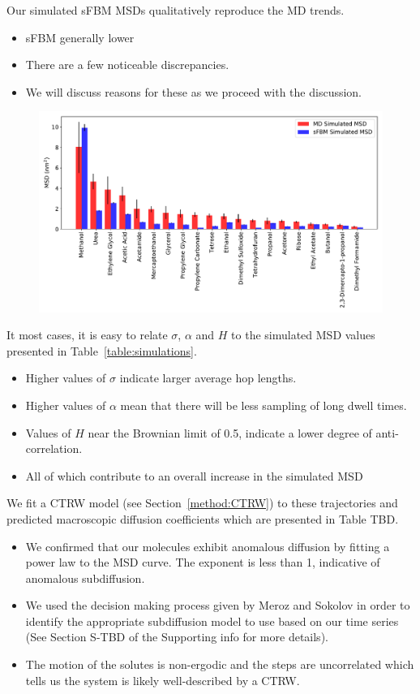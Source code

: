 \documentclass{article}
\begin{document}
  Our simulated sFBM MSDs qualitatively reproduce the MD trends.
  \begin{itemize}
    \item sFBM generally lower
    \item There are a few noticeable discrepancies.
    \item We will discuss reasons for these as we proceed with the discussion.
  \end{itemize}

  \begin{figure}
  \centering
  \includegraphics[width=\textwidth]{all_emsds.pdf}
  \caption{}\label{fig:all_msds}
  \end{figure}

  It most cases, it is easy to relate $\sigma$, $\alpha$ and $H$ to the
  simulated MSD values presented in Table~\ref{table:simulations}. 
  \begin{itemize}
  	\item Higher values of $\sigma$ indicate larger average hop lengths.
  	\item Higher values of $\alpha$ mean that there will be less sampling of 
  	long dwell times.
  	\item Values of $H$ near the Brownian limit of 0.5, indicate a lower degree
  	of anti-correlation.
  	\item All of which contribute to an overall increase in the simulated MSD
  \end{itemize}

  We fit a CTRW model (see Section~\ref{method:CTRW}) to these 
  trajectories and predicted macroscopic diffusion coefficients which are
  presented in Table TBD.
  \begin{itemize}
	\item We confirmed that our molecules exhibit anomalous diffusion
	by fitting a power law to the MSD curve. The exponent is less than
	1, indicative of anomalous subdiffusion.
	\item We used the decision making process given by Meroz and Sokolov
	in order to identify the appropriate subdiffusion model to use 
	based on our time series (See Section S-TBD of the Supporting info for
	more details).
	\item The motion of the solutes is non-ergodic and the steps are
	uncorrelated which tells us the system is likely well-described
	by a CTRW. 
  \end{itemize}
  
\end{document}
